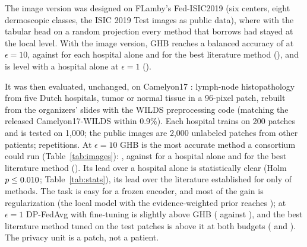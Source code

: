 The image version was designed on FLamby's Fed-ISIC2019 \cite{combalia2019bcn20000,ogierduterrail2022flamby} (six centers, eight dermoscopic classes, the ISIC 2019 Test images as public data), where with the tabular head on a random projection every method that borrows had stayed at the local level. With the image version, GHB reaches a balanced accuracy of \SimIsicTenGHB{} at $\epsilon=10$, against \SimIsicLocal{} for each hospital alone and \SimIsicTenBestReal{} for the best literature method (\SimIsicTenBestRealName), and is level with a hospital alone at $\epsilon=1$ (\SimIsicOneGHB).

It was then evaluated, unchanged, on Camelyon17 \cite{bandi2019camelyon17,koh2021wilds}: lymph-node histopathology from five Dutch hospitals, tumor or normal tissue in a 96-pixel patch, rebuilt from the organizers' slides with the WILDS preprocessing code (matching the released Camelyon17-WILDS within 0.9\%). Each hospital trains on 200 patches and is tested on 1,000; the public images are 2,000 unlabeled patches from other patients; \SimCamReps{} repetitions. At $\epsilon=10$ GHB is the most accurate method a consortium could run (Table~\ref{tab:images}): \SimCamTenGHB, against \SimCamLocal{} for a hospital alone and \SimCamTenBestReal{} for the best literature method (\SimCamTenBestRealName). Its lead over a hospital alone is statistically clear (Holm $p\le0.010$; Table~\ref{tab:stats}), its lead over the literature established for only \SimStCamLitEstablished{} of \SimStCamLit{} methods. The task is easy for a frozen encoder, and most of the gain is regularization (the local model with the evidence-weighted prior reaches \SimCamLocalEB); at $\epsilon=1$ DP-FedAvg \cite{mcmahan2018learning} with fine-tuning is slightly above GHB (\SimCamOneBestReal{} against \SimCamOneGHB), and the best literature method tuned on the test patches is above it at both budgets (\SimCamOneBestOrc{} and \SimCamTenBestOrc). The privacy unit is a patch, not a patient.

